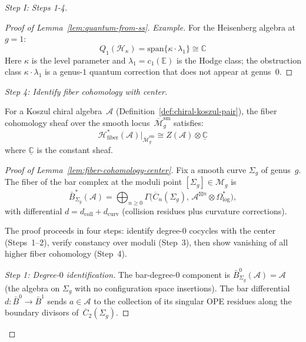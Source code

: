 \begin{proof}[Step I: Steps 1-4]
\begin{proof}[Proof of Lemma~\ref{lem:quantum-from-ss}]
\emph{Example.} For the Heisenberg algebra at $g=1$:
\begin{equation}
Q_1(\mathcal{H}_\kappa) = \text{span}\{\kappa \cdot \lambda_1\} \cong \mathbb{C}
\end{equation}
Here $\kappa$ is the level parameter and $\lambda_1 = c_1(\mathbb{E})$ is the Hodge class;
the obstruction class $\kappa \cdot \lambda_1$ is a genus-$1$ quantum correction
that does not appear at genus~$0$.
\end{proof}

\emph{Step 4: Identify fiber cohomology with center.}

\begin{lemma}
\label{lem:fiber-cohomology-center}
For a Koszul chiral algebra~$\mathcal{A}$
\textup{(}Definition~\textup{\ref{def:chiral-koszul-pair})},
the fiber cohomology sheaf over the smooth
locus~$\overline{\mathcal{M}}_g^{\mathrm{sm}}$ satisfies:
\begin{equation}
\mathcal{H}^*_{\mathrm{fiber}}(\mathcal{A})
\big|_{\overline{\mathcal{M}}_g^{\mathrm{sm}}}
\cong Z(\mathcal{A}) \otimes \underline{\mathbb{C}}
\end{equation}
where $\underline{\mathbb{C}}$ is the constant sheaf.
\end{lemma}

\begin{proof}[Proof of Lemma~\ref{lem:fiber-cohomology-center}]
Fix a smooth curve $\Sigma_g$ of genus~$g$.  The fiber of the bar
complex at the moduli point $[\Sigma_g] \in \mathcal{M}_g$ is
\begin{equation}\label{eq:fiber-bar-complex}
\bar{B}^*_{\Sigma_g}(\mathcal{A})
= \bigoplus_{n \geq 0}
  \Gamma\bigl(\overline{C}_n(\Sigma_g),\,
  \mathcal{A}^{\boxtimes n} \otimes \Omega^*_{\log}\bigr),
\end{equation}
with differential $d = d_{\mathrm{coll}} + d_{\mathrm{curv}}$
(collision residues plus curvature corrections).

The proof proceeds in four steps: identify degree-$0$ cocycles with
the center (Steps~1--2), verify constancy over moduli (Step~3), then
show vanishing of all higher fiber cohomology (Step~4).

\emph{Step 1: Degree-$0$ identification.}
The bar-degree-$0$ component is
$\bar{B}^0_{\Sigma_g}(\mathcal{A}) = \mathcal{A}$
(the algebra on $\Sigma_g$ with no configuration space insertions).
The bar differential
$d\colon \bar{B}^0 \to \bar{B}^1$ sends $a \in \mathcal{A}$ to
the collection of its singular OPE residues along the boundary
divisors of~$\overline{C}_2(\Sigma_g)$.


\end{proof}
\end{proof}
